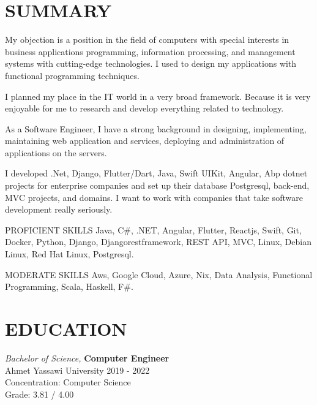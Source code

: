 \documentclass[line,margin]{res}
\begin{document}
\address{emre.yildiz.dev@hotmail.com}
\address{\href{https://linkedin.com/in/emre-yildiz-297ab0242}{https://linkedin.com/in/emre-yildiz-297ab0242}} 


 
\begin{resume}
 
\section{SUMMARY}   My objection is a position in the field of computers with special 
                interests in business applications programming, 
                information processing, and management systems with cutting-edge technologies. I used to design my applications with functional programming techniques. 
                
I planned my place in the IT world in a very broad framework. Because it is very enjoyable for me to research and develop everything related to technology.

As a Software Engineer, I have a strong background in designing, implementing, maintaining web application and services, deploying and administration of applications  on the servers.

I developed .Net, Django, Flutter/Dart, Java, Swift UIKit, Angular, Abp dotnet projects for enterprise companies and set up their database Postgresql, back-end, MVC projects, and domains.
I want to work with companies that take software development really seriously.

PROFICIENT SKILLS
Java, C#, .NET, Angular, Flutter, Reactjs, Swift, Git, Docker, Python, Django, Djangorestframework, REST API, MVC, Linux, Debian Linux, Red Hat Linux, Postgresql.

MODERATE SKILLS
Aws, Google Cloud, Azure, Nix, Data Analysis, Functional Programming, Scala, Haskell, F\#.
 
 
\section{EDUCATION} {\sl Bachelor of Science,} \textbf{Computer Engineer} \\
                Ahmet Yassawi University 
                2019 - 2022 \\
                Concentration: Computer Science \\
                Grade: 3.81 / 4.00 


\end{resume}
\end{document}
